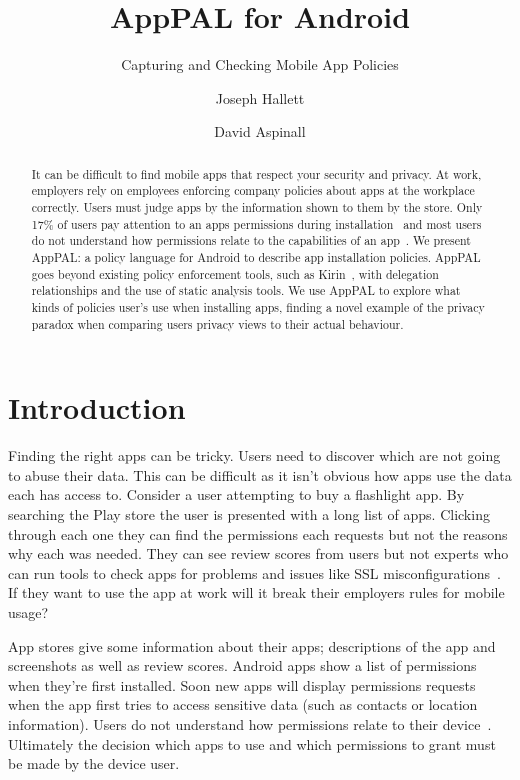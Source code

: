 \documentclass[]{llncs}
\title{AppPAL for Android}
\subtitle{Capturing and Checking Mobile App Policies}
\author{Joseph Hallett \and David Aspinall }
\institute{University of Edinburgh}
\newcommand{\comment}[1]{}%
\begin{document}
\maketitle{}

\begin{abstract}
  It can be difficult to find mobile apps that respect your security and privacy.
  At work, employers rely on employees enforcing company policies about apps at the workplace correctly.
  Users must judge apps by the information shown to them by the store.
  Only 17\% of users pay attention to an apps permissions during installation~\cite{Felt:2012hm} and
  most users do not understand how permissions relate to the capabilities of an app~\cite{Kelley:2012bw}.
  We present AppPAL: a policy language for Android to describe app installation  policies.
  AppPAL goes beyond existing policy enforcement tools, such as Kirin~\cite{Enck:2008vn}, with delegation relationships and the use of static analysis tools.
  We use AppPAL to explore what kinds of policies user's use when installing apps, finding a novel example of the privacy paradox when comparing users privacy views to their actual behaviour.
\end{abstract}

\section{Introduction \comment{1 page}}
\label{sec:introduction}

Finding the right apps can be tricky.
Users need to discover which are not going to abuse their data.
This can be difficult as it isn't obvious how apps use the data each has access to.
Consider a user attempting to buy a flashlight app.
By searching the Play store the user is presented with a long list of apps.
Clicking through each one they can find the permissions each requests but not the reasons why each was needed.
They can see review scores from users but not experts who can run tools to check apps for problems and issues like SSL misconfigurations~\cite{Fahl:2012dj}.
If they want to use the app at work will it break their employers rules for mobile usage?

App stores give some information about their apps; descriptions of the app and screenshots as well as review scores.
Android apps show a list of permissions when they're first installed.
Soon new apps will display permissions requests when the app first tries to access sensitive data (such as contacts or location information).
Users do not understand how permissions relate to their device~\cite{Felt:2012hm,Thompson:2013eb}.
Ultimately the decision which apps to use and which permissions to grant must be made by the device user.
\end{document}

